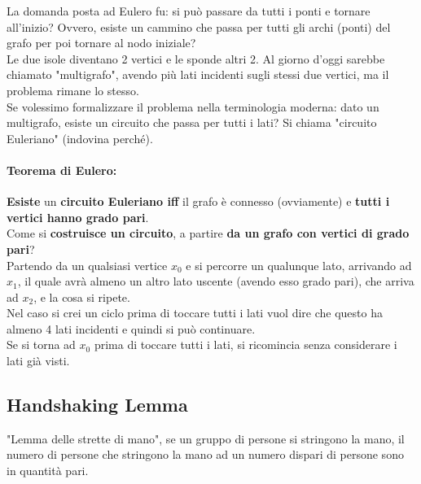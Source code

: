 \documentclass[11pt]{article}
\begin{document}
	La domanda posta ad Eulero fu: si può passare da tutti i ponti e tornare all'inizio? Ovvero, esiste un cammino che passa per tutti gli archi (ponti) del grafo per poi tornare al nodo iniziale?\\
	
	Le due isole diventano 2 vertici e le sponde altri 2. Al giorno d'oggi sarebbe chiamato "multigrafo", avendo più lati incidenti sugli stessi due vertici, ma il problema rimane lo stesso.\\
	
	Se volessimo formalizzare il problema nella terminologia moderna: dato un multigrafo, esiste un circuito che passa per tutti i lati? Si chiama "circuito Euleriano" (indovina perché).\\
	
	\paragraph{Teorema di Eulero:} \textbf{Esiste} un \textbf{circuito Euleriano iff} il grafo è connesso (ovviamente) e \textbf{tutti i vertici hanno grado pari}.\\
	
	Come si \textbf{costruisce un circuito}, a partire \textbf{da un grafo con vertici di grado pari}? \\
	Partendo da un qualsiasi vertice $x_0$ e si percorre un qualunque lato, arrivando ad $x_1$, il quale avrà almeno un altro lato uscente (avendo esso grado pari), che arriva ad $x_2$, e la cosa si ripete.\\
	Nel caso si crei un ciclo prima di toccare tutti i lati vuol dire che questo ha almeno 4 lati incidenti e quindi si può continuare.\\
	Se si torna ad $x_0$ prima di toccare tutti i lati, si ricomincia senza considerare i lati già visti.\\
	
	\newpage
	
	\subsection*{Handshaking Lemma}
	"Lemma delle strette di mano", se un gruppo di persone si stringono la mano, il numero di persone che stringono la mano ad un numero dispari di persone sono in quantità pari.\\
	
\end{document}

